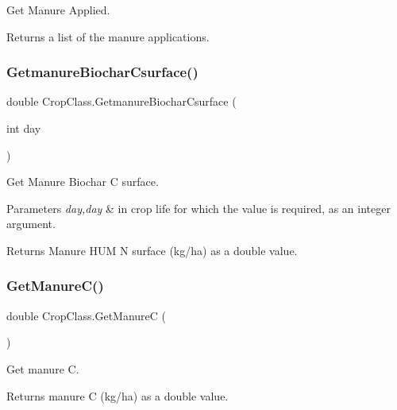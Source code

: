 Get Manure Applied. 

\begin{DoxyReturn}{Returns}
a list of the manure applications. 
\end{DoxyReturn}
\mbox{\label{class_crop_class_a0de8f90d381ca211a8faf2baa876b40d}} 
\subsubsection{\texorpdfstring{GetmanureBiocharCsurface()}{GetmanureBiocharCsurface()}}
{\footnotesize\ttfamily double Crop\+Class.\+Getmanure\+Biochar\+Csurface (\begin{DoxyParamCaption}\item[{int}]{day }\end{DoxyParamCaption})\hspace{0.3cm}{\ttfamily [inline]}}



Get Manure Biochar C surface. 


\begin{DoxyParams}{Parameters}
{\em day,day} & in crop life for which the value is required, as an integer argument. \\
\hline
\end{DoxyParams}
\begin{DoxyReturn}{Returns}
Manure H\+UM N surface (kg/ha) as a double value. 
\end{DoxyReturn}
\mbox{\label{class_crop_class_ae22552454a07b7068bf27518ce7a4020}} 
\subsubsection{\texorpdfstring{GetManureC()}{GetManureC()}}
{\footnotesize\ttfamily double Crop\+Class.\+Get\+ManureC (\begin{DoxyParamCaption}{ }\end{DoxyParamCaption})\hspace{0.3cm}{\ttfamily [inline]}}



Get manure C. 

\begin{DoxyReturn}{Returns}
manure C (kg/ha) as a double value. 
\end{DoxyReturn}
\mbox{\label{class_crop_class_af286463ec31e335517e89f046d349a1a}} 
